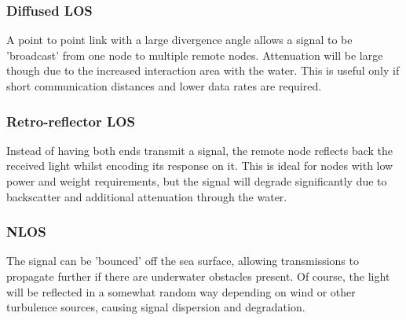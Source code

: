 \subsubsection{Diffused \ac{LOS}}
A point to point link with a large divergence angle allows a signal to be
'broadcast' from one node to multiple remote nodes. Attenuation will be large
though due to the increased interaction area with the water. This is useful
only if short communication distances and lower data rates are required.

\subsubsection{Retro-reflector \ac{LOS}}

Instead of having both ends transmit a signal, the remote node reflects back
the received light whilst encoding its response on it. This is ideal for nodes
with low power and weight requirements, but the signal will degrade
significantly due to backscatter and additional attenuation through the water.

\subsubsection{\ac{NLOS}}
The signal can be 'bounced' off the sea surface, allowing transmissions to
propagate further if there are underwater obstacles present. Of course, the
light will be reflected in a somewhat random way depending on wind or other
turbulence sources, causing signal dispersion and degradation.

